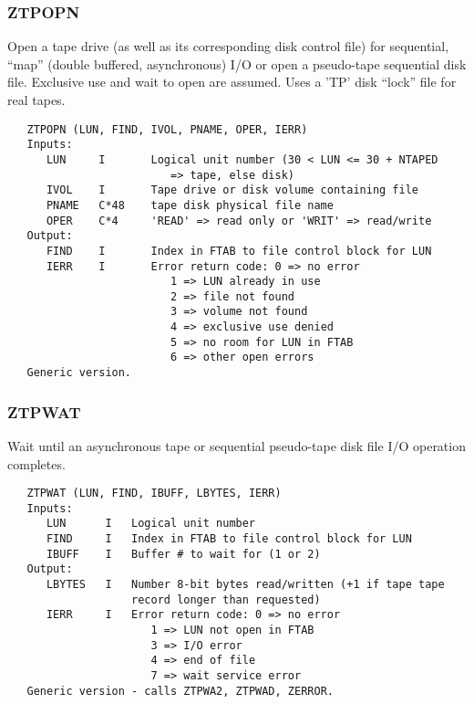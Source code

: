 \subsubsection{ZTPOPN}
Open a tape drive (as well as its corresponding disk control file)
for sequential, ``map'' (double buffered, asynchronous) I/O or open
a pseudo-tape sequential disk file.  Exclusive use and wait to open
are assumed.  Uses a 'TP' disk ``lock'' file for real tapes.
\begin{verbatim}
   ZTPOPN (LUN, FIND, IVOL, PNAME, OPER, IERR)
   Inputs:
      LUN     I       Logical unit number (30 < LUN <= 30 + NTAPED
                         => tape, else disk)
      IVOL    I       Tape drive or disk volume containing file
      PNAME   C*48    tape disk physical file name
      OPER    C*4     'READ' => read only or 'WRIT' => read/write
   Output:
      FIND    I       Index in FTAB to file control block for LUN
      IERR    I       Error return code: 0 => no error
                         1 => LUN already in use
                         2 => file not found
                         3 => volume not found
                         4 => exclusive use denied
                         5 => no room for LUN in FTAB
                         6 => other open errors
   Generic version.
\end{verbatim}

\subsubsection{ZTPWAT}
Wait until an asynchronous tape or sequential pseudo-tape disk file
I/O operation completes.
\begin{verbatim}
   ZTPWAT (LUN, FIND, IBUFF, LBYTES, IERR)
   Inputs:
      LUN      I   Logical unit number
      FIND     I   Index in FTAB to file control block for LUN
      IBUFF    I   Buffer # to wait for (1 or 2)
   Output:
      LBYTES   I   Number 8-bit bytes read/written (+1 if tape tape
                   record longer than requested)
      IERR     I   Error return code: 0 => no error
                      1 => LUN not open in FTAB
                      3 => I/O error
                      4 => end of file
                      7 => wait service error
   Generic version - calls ZTPWA2, ZTPWAD, ZERROR.
\end{verbatim}

